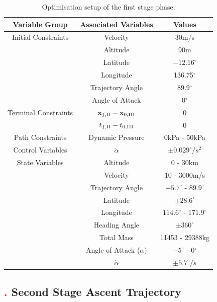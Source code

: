 \begin{table}[ht]
\centering
\begin{tabular}{|c|c|c|}
	\hline \textbf{Variable Group}  & \textbf{Associated Variables} & \textbf{Values}\\
	\hline Initial Constraints  & Velocity & 30m/s\\ & Altitude& 90m \\ & Latitude & $-12.16^\circ$ \\& Longitude & 136.75$^\circ$\\ & Trajectory Angle & 89.9$^\circ$\\ & Angle of Attack& 0$^\circ$\\
	\hline Terminal Constraints & $\textbf{x}_{f,\textrm{\rom{2}}} - \textbf{x}_{0,\textrm{\rom{3}}}$ & 0\\ & $t_{f,\textrm{\rom{2}}} - t_{0,\textrm{\rom{3}}}$ & 0\\
	\hline Path Constraints & Dynamic Pressure & 0kPa - 50kPa\\ 
		\hline Control Variables & $\ddot{\alpha}$ & $\pm0.029^\circ/s^2$\\ 
		\hline State Variables & Altitude & 0 - 30km\\ & Velocity& 10 - 3000m/s\\ & Trajectory Angle& $-5.7^\circ$ - $89.9^\circ$ \\   & Latitude& $\pm28.6^\circ$ \\  & Longitude& $114.6^\circ$ - $171.9^\circ$\\   & Heading Angle& $\pm360^\circ$\\  & Total Mass& 11453 - 29388kg \\  & Angle of Attack ($\alpha$)&  $-5^\circ$ - 0$^\circ$\\  & $\dot{\alpha}$& $\pm5.7^\circ/s$\\ 
	\hline 
\end{tabular} 

\caption{Optimisation setup of the first stage phase. }
\label{tab:1ststagesetup}
\end{table}



\subsection{\textcolor{red}{.} Second Stage Ascent Trajectory}



